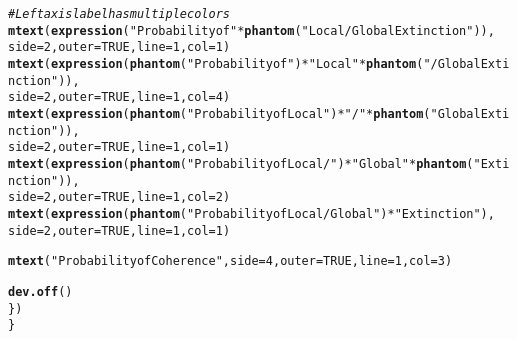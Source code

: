 \documentclass{article}\usepackage[]{graphicx}\usepackage[]{color}
\makeatletter
\newcommand{\hlnum}[1]{\textcolor[rgb]{0.686,0.059,0.569}{#1}}%
\newcommand{\hlstr}[1]{\textcolor[rgb]{0.192,0.494,0.8}{#1}}%
\newcommand{\hlcom}[1]{\textcolor[rgb]{0.678,0.584,0.686}{\textit{#1}}}%
\newcommand{\hlopt}[1]{\textcolor[rgb]{0,0,0}{#1}}%
\newcommand{\hlstd}[1]{\textcolor[rgb]{0.345,0.345,0.345}{#1}}%
\newcommand{\hlkwc}[1]{\textcolor[rgb]{0.333,0.667,0.333}{#1}}%
\newcommand{\hlkwd}[1]{\textcolor[rgb]{0.737,0.353,0.396}{\textbf{#1}}}%
\newenvironment{kframe}{%
 \def\at@end@of@kframe{}%
 \ifinner\ifhmode%
  \def\at@end@of@kframe{\end{minipage}}%
  \begin{minipage}{\columnwidth}%
 \fi\fi%
 \def\FrameCommand##1{\hskip\@totalleftmargin \hskip-\fboxsep
 \colorbox{shadecolor}{##1}\hskip-\fboxsep
     \hskip-\linewidth \hskip-\@totalleftmargin \hskip\columnwidth}%
 \MakeFramed {\advance\hsize-\width
   \@totalleftmargin\z@ \linewidth\hsize
   \@setminipage}}%
 {\par\unskip\endMakeFramed%
 \at@end@of@kframe}
\newenvironment{knitrout}{}{} %
\makeatother
\begin{document}
\begin{knitrout}
\begin{kframe}
\begin{alltt}
\hlcom{#Left axis label has multiple colors}
\hlkwd{mtext}\hlstd{(}\hlkwd{expression}\hlstd{(}\hlstr{"Probability of "}\hlopt{*}\hlkwd{phantom}\hlstd{(}\hlstr{"Local/ Global Extinction"}\hlstd{)),}
      \hlkwc{side} \hlstd{=} \hlnum{2}\hlstd{,} \hlkwc{outer} \hlstd{=} \hlnum{TRUE}\hlstd{,} \hlkwc{line} \hlstd{=} \hlnum{1}\hlstd{,} \hlkwc{col} \hlstd{=} \hlnum{1}\hlstd{)}
\hlkwd{mtext}\hlstd{(}\hlkwd{expression}\hlstd{(}\hlkwd{phantom}\hlstd{(}\hlstr{"Probability of "}\hlstd{)}\hlopt{*}\hlstr{"Local"}\hlopt{*}\hlkwd{phantom}\hlstd{(}\hlstr{"/ Global Extinction"}\hlstd{)),}
      \hlkwc{side} \hlstd{=} \hlnum{2}\hlstd{,} \hlkwc{outer} \hlstd{=} \hlnum{TRUE}\hlstd{,} \hlkwc{line} \hlstd{=} \hlnum{1}\hlstd{,} \hlkwc{col} \hlstd{=} \hlnum{4}\hlstd{)}
\hlkwd{mtext}\hlstd{(}\hlkwd{expression}\hlstd{(}\hlkwd{phantom}\hlstd{(}\hlstr{"Probability of Local"}\hlstd{)}\hlopt{*}\hlstr{"/"}\hlopt{*}\hlkwd{phantom}\hlstd{(}\hlstr{" Global Extinction"}\hlstd{)),}
      \hlkwc{side} \hlstd{=} \hlnum{2}\hlstd{,} \hlkwc{outer} \hlstd{=} \hlnum{TRUE}\hlstd{,} \hlkwc{line} \hlstd{=} \hlnum{1}\hlstd{,} \hlkwc{col} \hlstd{=} \hlnum{1}\hlstd{)}
\hlkwd{mtext}\hlstd{(}\hlkwd{expression}\hlstd{(}\hlkwd{phantom}\hlstd{(}\hlstr{"Probability of Local/"}\hlstd{)}\hlopt{*}\hlstr{" Global"}\hlopt{*}\hlkwd{phantom}\hlstd{(}\hlstr{" Extinction"}\hlstd{)),}
      \hlkwc{side} \hlstd{=} \hlnum{2}\hlstd{,} \hlkwc{outer} \hlstd{=} \hlnum{TRUE}\hlstd{,} \hlkwc{line} \hlstd{=} \hlnum{1}\hlstd{,} \hlkwc{col} \hlstd{=} \hlnum{2}\hlstd{)}
\hlkwd{mtext}\hlstd{(}\hlkwd{expression}\hlstd{(}\hlkwd{phantom}\hlstd{(}\hlstr{"Probability of Local/ Global"}\hlstd{)}\hlopt{*}\hlstr{" Extinction"}\hlstd{),}
      \hlkwc{side} \hlstd{=} \hlnum{2}\hlstd{,} \hlkwc{outer} \hlstd{=} \hlnum{TRUE}\hlstd{,} \hlkwc{line} \hlstd{=} \hlnum{1}\hlstd{,} \hlkwc{col} \hlstd{=} \hlnum{1}\hlstd{)}

\hlkwd{mtext}\hlstd{(}\hlstr{"Probability of Coherence"}\hlstd{,} \hlkwc{side} \hlstd{=} \hlnum{4}\hlstd{,} \hlkwc{outer} \hlstd{=} \hlnum{TRUE}\hlstd{,} \hlkwc{line} \hlstd{=} \hlnum{1}\hlstd{,} \hlkwc{col} \hlstd{=} \hlnum{3}\hlstd{)}

 \hlkwd{dev.off}\hlstd{()}
       \hlstd{\})}
 \hlstd{\}}
\end{alltt}
\end{kframe}
\end{knitrout}
\end{document}
